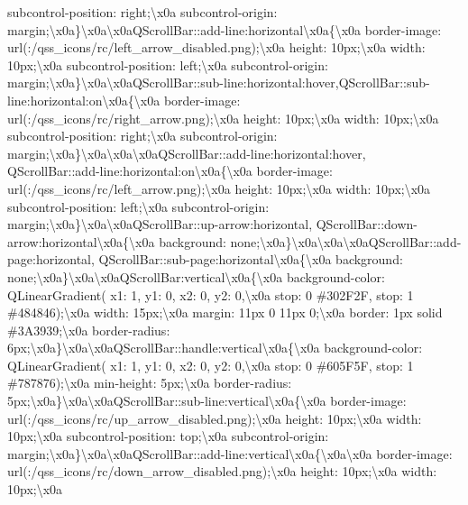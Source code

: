subcontrol-\/position\+: right;\textbackslash{}x0a subcontrol-\/origin\+: margin;\textbackslash{}x0a\}\textbackslash{}x0a\textbackslash{}x0a\+Q\+Scroll\+Bar\+::add-\/line\+:horizontal\textbackslash{}x0a\{\textbackslash{}x0a border-\/image\+: url(\+:/qss\+\_\+icons/rc/left\+\_\+arrow\+\_\+disabled.\+png);\textbackslash{}x0a height\+: 10px;\textbackslash{}x0a width\+: 10px;\textbackslash{}x0a subcontrol-\/position\+: left;\textbackslash{}x0a subcontrol-\/origin\+: margin;\textbackslash{}x0a\}\textbackslash{}x0a\textbackslash{}x0a\+Q\+Scroll\+Bar\+::sub-\/line\+:horizontal\+:hover,\+Q\+Scroll\+Bar\+::sub-\/line\+:horizontal\+:on\textbackslash{}x0a\{\textbackslash{}x0a border-\/image\+: url(\+:/qss\+\_\+icons/rc/right\+\_\+arrow.\+png);\textbackslash{}x0a height\+: 10px;\textbackslash{}x0a width\+: 10px;\textbackslash{}x0a subcontrol-\/position\+: right;\textbackslash{}x0a subcontrol-\/origin\+: margin;\textbackslash{}x0a\}\textbackslash{}x0a\textbackslash{}x0a\textbackslash{}x0a\+Q\+Scroll\+Bar\+::add-\/line\+:horizontal\+:hover, Q\+Scroll\+Bar\+::add-\/line\+:horizontal\+:on\textbackslash{}x0a\{\textbackslash{}x0a border-\/image\+: url(\+:/qss\+\_\+icons/rc/left\+\_\+arrow.\+png);\textbackslash{}x0a height\+: 10px;\textbackslash{}x0a width\+: 10px;\textbackslash{}x0a subcontrol-\/position\+: left;\textbackslash{}x0a subcontrol-\/origin\+: margin;\textbackslash{}x0a\}\textbackslash{}x0a\textbackslash{}x0a\+Q\+Scroll\+Bar\+::up-\/arrow\+:horizontal, Q\+Scroll\+Bar\+::down-\/arrow\+:horizontal\textbackslash{}x0a\{\textbackslash{}x0a background\+: none;\textbackslash{}x0a\}\textbackslash{}x0a\textbackslash{}x0a\textbackslash{}x0a\+Q\+Scroll\+Bar\+::add-\/page\+:horizontal, Q\+Scroll\+Bar\+::sub-\/page\+:horizontal\textbackslash{}x0a\{\textbackslash{}x0a background\+: none;\textbackslash{}x0a\}\textbackslash{}x0a\textbackslash{}x0a\+Q\+Scroll\+Bar\+:vertical\textbackslash{}x0a\{\textbackslash{}x0a background-\/color\+: Q\+Linear\+Gradient( x1\+: 1, y1\+: 0, x2\+: 0, y2\+: 0,\textbackslash{}x0a stop\+: 0 \#302\+F2\+F, stop\+: 1 \#484846);\textbackslash{}x0a width\+: 15px;\textbackslash{}x0a margin\+: 11px 0 11px 0;\textbackslash{}x0a border\+: 1px solid \#3\+A3939;\textbackslash{}x0a border-\/radius\+: 6px;\textbackslash{}x0a\}\textbackslash{}x0a\textbackslash{}x0a\+Q\+Scroll\+Bar\+::handle\+:vertical\textbackslash{}x0a\{\textbackslash{}x0a background-\/color\+: Q\+Linear\+Gradient( x1\+: 1, y1\+: 0, x2\+: 0, y2\+: 0,\textbackslash{}x0a stop\+: 0 \#605\+F5\+F, stop\+: 1 \#787876);\textbackslash{}x0a min-\/height\+: 5px;\textbackslash{}x0a border-\/radius\+: 5px;\textbackslash{}x0a\}\textbackslash{}x0a\textbackslash{}x0a\+Q\+Scroll\+Bar\+::sub-\/line\+:vertical\textbackslash{}x0a\{\textbackslash{}x0a border-\/image\+: url(\+:/qss\+\_\+icons/rc/up\+\_\+arrow\+\_\+disabled.\+png);\textbackslash{}x0a height\+: 10px;\textbackslash{}x0a width\+: 10px;\textbackslash{}x0a subcontrol-\/position\+: top;\textbackslash{}x0a subcontrol-\/origin\+: margin;\textbackslash{}x0a\}\textbackslash{}x0a\textbackslash{}x0a\+Q\+Scroll\+Bar\+::add-\/line\+:vertical\textbackslash{}x0a\{\textbackslash{}x0a\textbackslash{}x0a border-\/image\+: url(\+:/qss\+\_\+icons/rc/down\+\_\+arrow\+\_\+disabled.\+png);\textbackslash{}x0a height\+: 10px;\textbackslash{}x0a width\+: 10px;\textbackslash{}x0a 